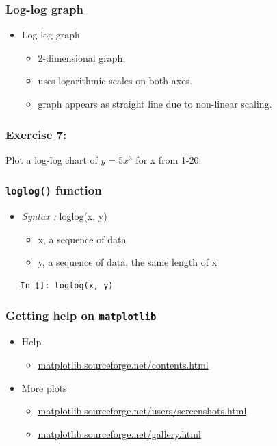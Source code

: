 \documentclass[presentation]{beamer}
\begin{document}
\begin{frame}
\frametitle{Log-log graph}
\label{sec-13}

\begin{itemize}
\item Log-log graph

\begin{itemize}
\item 2-dimensional graph.
\item uses logarithmic scales on both axes.
\item graph appears as straight line due to non-linear scaling.
\end{itemize}

\end{itemize}
\end{frame}
\begin{frame}
\frametitle{Exercise 7:}
\label{sec-14}

  Plot a log-log chart of 
    $y = 5x^3$
  for x from 1-20.
\end{frame}
\begin{frame}[fragile]
\frametitle{\texttt{loglog()} function}
\label{sec-15}

\begin{itemize}
\item \emph{Syntax :} loglog(x, y)

\begin{itemize}
\item x, a sequence of data
\item y, a sequence of data, the same length of x
\end{itemize}

\end{itemize}

\begin{verbatim}
   In []: loglog(x, y)
\end{verbatim}
\end{frame}
\begin{frame}
\frametitle{Getting help on \texttt{matplotlib}}
\label{sec-16}

\begin{itemize}
\item Help

\begin{itemize}
\item \hyperref[sec-16]{matplotlib.sourceforge.net/contents.html}
\end{itemize}

\item More plots

\begin{itemize}
\item \hyperref[sec-16]{matplotlib.sourceforge.net/users/screenshots.html}
\item \hyperref[sec-16]{matplotlib.sourceforge.net/gallery.html}
\end{itemize}

\end{itemize}
\end{frame}
\end{document}
